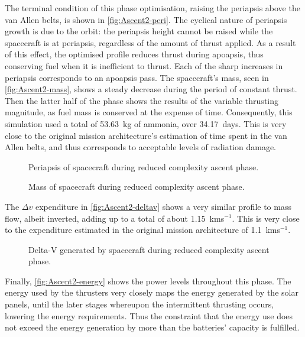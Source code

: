 The terminal condition of this phase optimisation, raising the periapsis above the van Allen belts, is shown in \autoref{fig:Ascent2-peri}. The cyclical nature of periapsis growth is due to the orbit: the periapsis height cannot be raised while the spacecraft is at periapsis, regardless of the amount of thrust applied. As a result of this effect, the optimised profile reduces thrust during apoapsis, thus conserving fuel when it is inefficient to thrust. Each of the sharp increases in periapsis corresponds to an apoapsis pass. The spacecraft's mass, seen in \autoref{fig:Ascent2-mass}, shows a steady decrease during the period of constant thrust. Then the latter half of the phase shows the results of the variable thrusting magnitude, as fuel mass is conserved at the expense of time. Consequently, this simulation used a total of 53.63~kg of ammonia, over 34.17~days. This is very close to the original mission architecture's estimation of time spent in the van Allen belts, and thus corresponds to acceptable levels of radiation damage.

\begin{figure}
\centering
\def\svgwidth{\figurewidth}

\caption{Periapsis of spacecraft during reduced complexity ascent phase.} \label{fig:Ascent2-peri}
\end{figure}

\begin{figure}
\centering
\def\svgwidth{\figurewidth}

\caption{Mass of spacecraft during reduced complexity ascent phase.} \label{fig:Ascent2-mass}
\end{figure}

The $\Delta v$ expenditure in \autoref{fig:Ascent2-deltav} shows a very similar profile to mass flow, albeit inverted, adding up to a total of about 1.15~kms$^{-1}$. This is very close to the expenditure estimated in the original mission architecture of 1.1~kms$^{-1}$.

\begin{figure}
\centering
\def\svgwidth{\figurewidth}

\caption{Delta-V generated by spacecraft during reduced complexity ascent phase.} \label{fig:Ascent2-deltav}
\end{figure}

Finally, \autoref{fig:Ascent2-energy} shows the power levels throughout this phase. The energy used by the thrusters very closely maps the energy generated by the solar panels, until the later stages whereupon the intermittent thrusting occurs, lowering the energy requirements. Thus the constraint that the energy use does not exceed the energy generation by more than the batteries' capacity is fulfilled.

